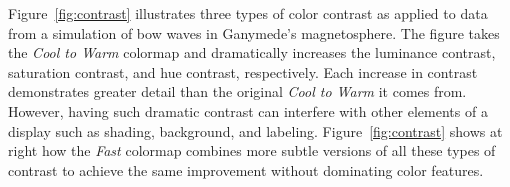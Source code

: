 \documentclass{IEEEcsmag}
\newcommand*{\km}[1]{\textcolor{km}{\emph{\textbf{#1} -- KM}}}
\newcommand*{\fs}[1]{\textcolor{fs}{\emph{\textbf{#1} -- FS}}}
\newcommand*{\colormap}[1]{\textsl{#1}\xspace}
\newcommand*{\coolwarm}{\colormap{Cool to Warm}}
\newcommand*{\fast}{\colormap{Fast}}
\begin{document}
Figure~\ref{fig:contrast} illustrates three types of color contrast as applied to data from a simulation of bow waves in Ganymede's magnetosphere.
The figure takes the \coolwarm colormap and dramatically increases the luminance contrast, saturation contrast, and hue contrast, respectively.
Each increase in contrast demonstrates greater detail than the original \coolwarm it comes from.
However, having such dramatic contrast can interfere with other elements of a display such as shading, background, and labeling.
Figure~\ref{fig:contrast} shows at right how the \fast colormap combines more subtle versions of all these types of contrast to achieve the same improvement without dominating color features.



\end{document}
